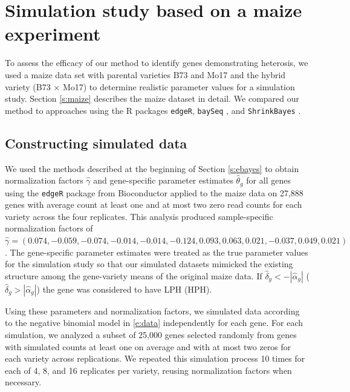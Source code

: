 \documentclass[useAMS,usenatbib,referee]{biom}
\newcommand{\edgeR}{{\tt edgeR}}
\newcommand{\baySeq}{{\tt baySeq}}
\newcommand{\ShrinkBayes}{{\tt ShrinkBayes}}
\begin{document}
\section{Simulation study based on a maize experiment}
\label{s:simulation}

% 

To assess the efficacy of our method to identify genes demonstrating heterosis, we used a maize data set with parental varieties B73 and Mo17 and the hybrid variety (B73 $\times$ Mo17) \citep{paschold2012complementation} to determine realistic parameter values for a simulation study. Section \ref{s:maize} describes the maize dataset in detail. We compared our method to approaches using the R packages \edgeR{}, \baySeq{} \citep{hardcastle2010bayseq, hardcastle2012baySeq}, and \ShrinkBayes{} \citep{van2014shrinkbayes}.

\subsection{Constructing simulated data}
\label{s:sim_data}

We used the methods described at the beginning of Section \ref{s:ebayes} to obtain normalization factors $\hat{\gamma}$ and gene-specific parameter estimates $\hat{\theta}_g$ for all genes using the \edgeR{} package \citep{robinson2010edgeR} from Bioconductor \citep{gentleman2004bioconductor} applied to the maize data on 27,888 genes with average count at least one and at most two zero read counts for each variety across the four replicates.  This analysis produced sample-specific normalization factors of $\hat{\gamma}=
(0.074, -0.059, -0.074, -0.014, -0.014, -0.124,  0.093,  0.063,  0.021, -0.037,  0.049,  0.021)$. The  gene-specific parameter estimates were treated as the true parameter values for the simulation study so that our simulated datasets mimicked the existing structure among the gene-variety means of the original maize data. If $\hat{\delta}_g<-|\hat{\alpha}_g|$ ($\hat{\delta}_g >|\hat{\alpha}_g|$)  the gene was considered to have LPH (HPH).

Using these parameters and normalization factors, we simulated data according to the negative binomial model in \eqref{e:data} independently for each gene. For each simulation, we analyzed a subset of 25,000 genes selected randomly from genes with simulated counts at least one on average and with at most two zeros for each variety across replications.  We repeated this simulation process 10 times for each of 4, 8, and 16 replicates per variety, reusing normalization factors when necessary.  
\end{document}
